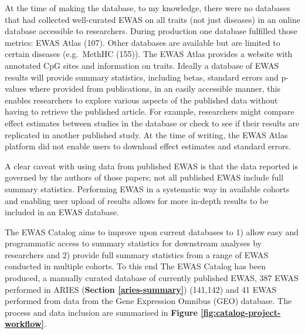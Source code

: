 \documentclass[11pt,twoside]{bristolthesis}
\begin{document}
At the time of making the database, to my knowledge, there were no databases that had collected well-curated EWAS on all traits (not just diseases) in an online database accessible to researchers. During production one database fulfilled those metrics: EWAS Atlas (107). Other databases are available but are limited to certain diseases (e.g.~MethHC (155)). The EWAS Atlas provides a website with annotated CpG sites and information on traits. Ideally a database of EWAS results will provide summary statistics, including betas, standard errors and p-values where provided from publications, in an easily accessible manner, this enables researchers to explore various aspects of the published data without having to retrieve the published article. For example, researchers might compare effect estimates between studies in the database or check to see if their results are replicated in another published study. At the time of writing, the EWAS Atlas platform did not enable users to download effect estimates and standard errors.

A clear caveat with using data from published EWAS is that the data reported is governed by the authors of those papers; not all published EWAS include full summary statistics. Performing EWAS in a systematic way in available cohorts and enabling user upload of results allows for more in-depth results to be included in an EWAS database.

The EWAS Catalog aims to improve upon current databases to 1) allow easy and programmatic access to summary statistics for downstream analyses by researchers and 2) provide full summary statistics from a range of EWAS conducted in multiple cohorts. To this end The EWAS Catalog has been produced, a manually curated database of currently published EWAS, 387 EWAS performed in ARIES (\textbf{Section \ref{aries-summary}}) (141,142) and 41 EWAS performed from data from the Gene Expression Omnibus (GEO) database. The process and data inclusion are summarised in \textbf{Figure \ref{fig:catalog-project-workflow}}.
\end{document}

